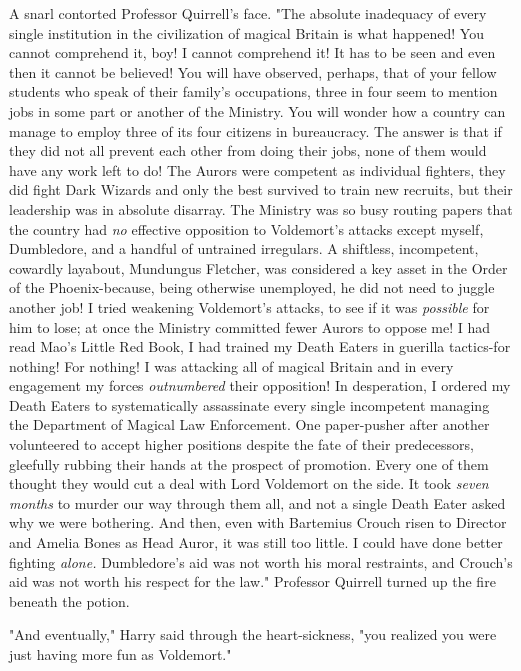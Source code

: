 A snarl contorted Professor Quirrell's face. "The absolute inadequacy of every 
single institution in the civilization of magical Britain is what happened! You 
cannot comprehend it, boy! I cannot comprehend it! It has to be seen and even 
then it cannot be believed! You will have observed, perhaps, that of your 
fellow students who speak of their family's occupations, three in four seem to 
mention jobs in some part or another of the Ministry. You will wonder how a 
country can manage to employ three of its four citizens in bureaucracy. The 
answer is that if they did not all prevent each other from doing their jobs, 
none of them would have any work left to do! The Aurors were competent as 
individual fighters, they did fight Dark Wizards and only the best survived to 
train new recruits, but their leadership was in absolute disarray. The Ministry 
was so busy routing papers that the country had \emph{no} effective opposition 
to Voldemort's attacks except myself, Dumbledore, and a handful of untrained 
irregulars. A shiftless, incompetent, cowardly layabout, Mundungus Fletcher, 
was considered a key asset in the Order of the Phoenix-because, being otherwise 
unemployed, he did not need to juggle another job! I tried weakening 
Voldemort's attacks, to see if it was \emph{possible} for him to lose; at once 
the Ministry committed fewer Aurors to oppose me! I had read Mao's Little Red 
Book, I had trained my Death Eaters in guerilla tactics-for nothing! For 
nothing! I was attacking all of magical Britain and in every engagement my 
forces \emph{outnumbered} their opposition! In desperation, I ordered my Death 
Eaters to systematically assassinate every single incompetent managing the 
Department of Magical Law Enforcement. One paper-pusher after another 
volunteered to accept higher positions despite the fate of their predecessors, 
gleefully rubbing their hands at the prospect of promotion. Every one of them 
thought they would cut a deal with Lord Voldemort on the side. It took 
\emph{seven months} to murder our way through them all, and not a single Death 
Eater asked why we were bothering. And then, even with Bartemius Crouch risen 
to Director and Amelia Bones as Head Auror, it was still too little. I could 
have done better fighting \emph{alone.} Dumbledore's aid was not worth his 
moral restraints, and Crouch's aid was not worth his respect for the law." 
Professor Quirrell turned up the fire beneath the potion.

"And eventually," Harry said through the heart-sickness, "you realized you were 
just having more fun as Voldemort."


